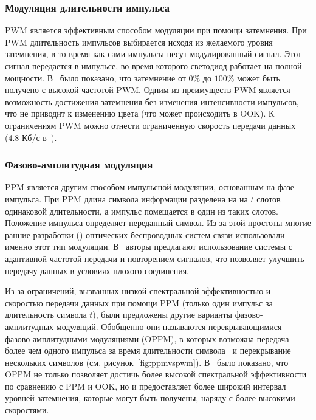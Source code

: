 \subsubsection{Модуляция длительности импульса}

PWM является эффективным способом модуляции при помощи затемнения. При PWM длительность импульсов выбирается исходя из желаемого уровня затемнения, в то время как сами импульсы несут модулированный сигнал. Этот сигнал передается в импульсе, во время которого светодиод работает на полной мощности. В~\cite{Sugiyama2007} было показано, что затемнение от $0\%$ до $100\%$ может быть получено с высокой частотой PWM. Одним из преимуществ PWM является возможность достижения затемнения без изменения интенсивности импульсов, что не приводит к изменению цвета (что может происходить в OOK). К ограничениям PWM можно отнести ограниченную скорость передачи данных (4.8 Кб/с в~\cite{Sugiyama2007}). 

\subsubsection{Фазово-амплитудная модуляция}

PPM является другим способом импульсной модуляции, основанным на фазе импульса. При PPM длина символа информации разделена на на $t$ слотов одинаковой длительности, а импульс помещается в один из таких слотов. Положение импульса определяет переданный символ. Из-за этой простоты многие ранние разработки (\cite{Georghiades1994,Shiu1999}) оптических беспроводных систем связи использовали именно этот тип модуляции. В~\cite{Gfeller1996} авторы предлагают использование системы с адаптивной частотой передачи и повторением сигналов, что позволяет улучшить передачу данных в условиях плохого соединения. 


Из-за ограничений, вызванных низкой спектральной эффективностью и скоростью передачи данных при помощи PPM (только один импульс за длительность символа $t$), были предложены другие варианты фазово-амплитудных модуляций. Обобщенно они называются перекрывающимися фазово-амплитудными модуляциями (OPPM), в которых возможна передача более чем одного импульса за время длительности символа~\cite{Shiu1999} и перекрывание нескольких символов (см. рисунок~\ref{fig:ppmvspwm}). В~\cite{BoBai2010} было показано, что OPPM не только позволяет достичь более высокой спектральной эффективности по сравнению с PPM и OOK, но и предоставляет более широкий интервал уровней затемнения, которые могут быть получены, наряду с более высокими скоростями.  


